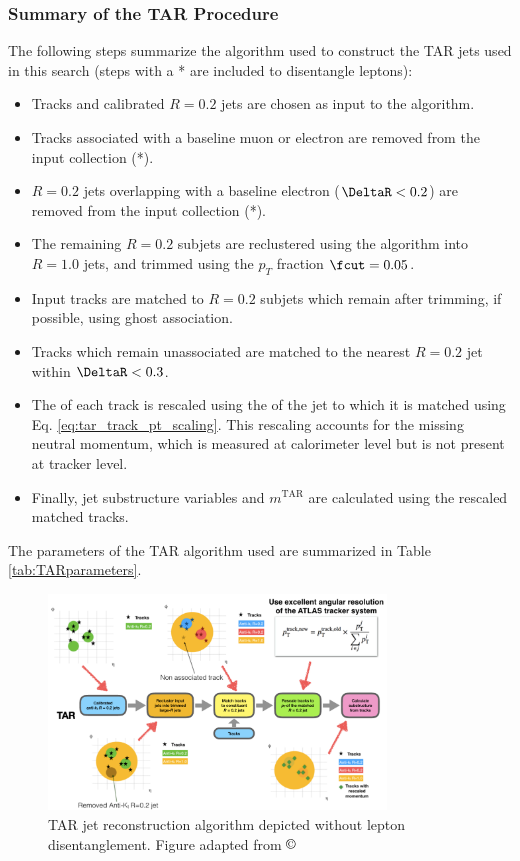 \subsubsection{Summary of the TAR Procedure}

The following steps summarize the algorithm used to construct the TAR jets used in this search (steps with a * are included to disentangle leptons):
\begin{itemize}
  \item Tracks and calibrated \akt \(R=0.2\) jets are chosen as input to the algorithm.
  \item Tracks associated with a baseline muon or electron are removed from the input collection (*).
  \item \(R=0.2\) jets overlapping with a baseline electron (\(\DeltaR<0.2\)) are removed from the input collection (*).
  \item The remaining \(R=0.2\) subjets are reclustered using the \akt algorithm into \(R=1.0\) jets, and trimmed using the \(p_T\) fraction \(\fcut=0.05\).
  \item Input tracks are matched to \(R=0.2\) subjets which remain after trimming, if possible, using ghost association.
  \item Tracks which remain unassociated are matched to the nearest \akt \(R=0.2\) jet within \(\DeltaR<0.3\).
  \item The \pt of each track is rescaled using the \pt of the jet to which it is matched using Eq. \ref{eq:tar_track_pt_scaling}. This rescaling accounts for the missing neutral momentum, which is measured at calorimeter level but is not present at tracker level.
  \item Finally, jet substructure variables and  \(m^\text{TAR}\) are calculated using the rescaled matched tracks.
\end{itemize}
The parameters of the TAR algorithm used are summarized in Table \ref{tab:TARparameters}. \\

\begin{figure}[htb]
  \centering
     \includegraphics[width = 0.80\textwidth]{Figures/5/TARJetdescription.pdf}
     \caption{TAR jet reconstruction algorithm depicted without lepton disentanglement. Figure adapted from \(\copyright\) \cite{ATL-PHYS-PUB-2018-012}}
     \label{fig:TARAlg}
  \end{figure}

